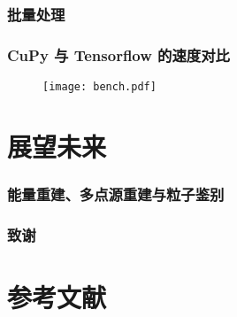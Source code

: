 \documentclass[aspectratio=149]{beamer}
\begin{document}
\begin{frame}
    \frametitle{批量处理}



\end{frame}

\begin{frame}
    \frametitle{CuPy 与 Tensorflow 的速度对比}

    \begin{figure}
        \centering
        \texttt{[image: bench.pdf]}
    \end{figure}

\end{frame}
\section{展望未来}
\begin{frame}
    \frametitle{能量重建、多点源重建与粒子鉴别}



\end{frame}

\begin{frame}
    \frametitle{致谢}



\end{frame}
\section{参考文献}
\end{document}
